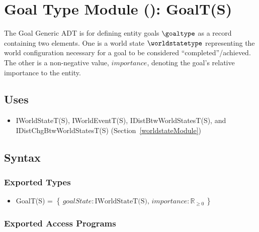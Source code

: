 \section{Goal Type Module (): GoalT(S)} \label{goalModule}
The Goal Generic ADT is for defining entity goals $\goaltype$ as a record
containing two elements. One is a world state $\worldstatetype$ representing
the world configuration necessary for a goal to be considered
``completed''/achieved. The other is a non-negative value,
$\mathit{importance}$, denoting the goal's relative importance to the entity.

\subsection{Uses}
\begin{itemize}[noitemsep, nosep]

    \item IWorldStateT(S), IWorldEventT(S), IDistBtwWorldStatesT(S), and
    IDistChgBtwWorldStatesT(S) (Section~\ref{worldstateModule})

\end{itemize}

\subsection{Syntax}

\subsubsection{Exported Types}
\begin{itemize}

    \item GoalT(S) = $ \left\{ \, \mathit{goalState} : \text{IWorldStateT(S)},
    \,
    \mathit{importance} : \mathbb{R}_{\geq 0} \, \right\} $

\end{itemize}

\subsubsection{Exported Access Programs}

